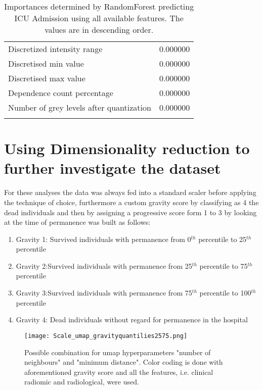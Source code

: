 \begin{longtable}{|lr|}
Discretized intensity range                        &        0.000000 \\
Discretised min value                              &        0.000000 \\
Discretised max value                              &        0.000000 \\
Dependence count percentage                        &        0.000000 \\
Number of grey levels after quantization           &        0.000000 \\
\bottomrule
\caption{Importances determined by RandomForest predicting ICU Admission using all available features. The values are in descending order.} %
\label{tab:RFimpoRad}
\end{longtable}

\section{Using Dimensionality reduction to further investigate the dataset}
For these analyses the data was always fed into a standard scaler before applying the technique of choice, furthermore a custom gravity score by classifying as 4 the dead individuals and then by assigning a progressive score form 1 to 3 by looking at the time of permanence was built as follows:

\begin{enumerate}
\item Gravity 1: Survived individuals with permanence from 0$^{th}$ percentile to 25$^{th}$ percentile
\item Gravity 2:Survived individuals with permanence from 25$^{th}$ percentile to 75$^{th}$ percentile
\item Gravity 3:Survived individuals with permanence from 75$^{th}$ percentile to 100$^{th}$ percentile
\item Gravity 4: Dead individuals without regard for permanence in the hospital
\end{enumerate}

\begin{figure}[htbp]
	\centering 
  		\texttt{[image: Scale\_umap\_gravityquantilies2575.png]}
        \caption{Possible combination for umap hyperparameters "number of neighbours" and "minimum distance". Color coding is done with aforementioned gravity score and all the features, i.e. clinical radiomic and radiological, were used.  \label{fig:hyperparam_umap}}
\end{figure}


